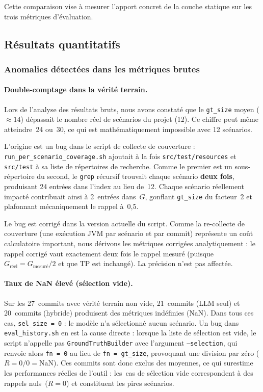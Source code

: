 \documentclass[12pt,a4paper]{article}
\begin{document}
Cette comparaison vise à mesurer l'apport concret de la couche statique
sur les trois métriques d'évaluation.

\subsection{Résultats quantitatifs}

\subsubsection{Anomalies détectées dans les métriques brutes}

\paragraph{Double-comptage dans la vérité terrain.}
Lors de l'analyse des résultats bruts, nous avons constaté que le
\texttt{gt\_size} moyen ($\approx 14$) dépassait le nombre réel de
scénarios du projet (12). Ce chiffre peut même atteindre~24 ou~30, ce
qui est mathématiquement impossible avec 12 scénarios.

L'origine est un bug dans le script de collecte de couverture :
\texttt{run\_per\_scenario\_coverage.sh} ajoutait à la fois
\texttt{src/test/resources} et \texttt{src/test} à sa liste de
répertoires de recherche. Comme le premier est un sous-répertoire du
second, le \texttt{grep} récursif trouvait chaque scénario \textbf{deux fois},
produisant 24 entrées dans l'index au lieu de~12. Chaque scénario
réellement impacté contribuait ainsi à 2~entrées dans~$G$, gonflant
\texttt{gt\_size} du facteur~2 et plafonnant mécaniquement le rappel à~0{,}5.

Le bug est corrigé dans la version actuelle du script. Comme la
re-collecte de couverture (une exécution JVM par scénario et par commit)
représente un coût calculatoire important, nous dérivons les métriques
corrigées analytiquement : le rappel corrigé vaut exactement deux fois
le rappel mesuré (puisque $G_{\text{réel}} = G_{\text{mesuré}} / 2$ et
que TP est inchangé). La précision n'est pas affectée.

\paragraph{Taux de NaN élevé (sélection vide).}
Sur les 27~commits avec vérité terrain non vide, 21~commits (LLM seul)
et 20~commits (hybride) produisent des métriques indéfinies (NaN).
Dans tous ces cas, \texttt{sel\_size = 0} : le modèle n'a sélectionné
aucun scénario. Un bug dans \texttt{eval\_history.sh} en est la cause
directe : lorsque la liste de sélection est vide, le script n'appelle
pas \texttt{GroundTruthBuilder} avec l'argument \texttt{--selection},
qui renvoie alors \texttt{fn = 0} au lieu de \texttt{fn = gt\_size},
provoquant une division par zéro ($R = 0/0 = \text{NaN}$). Ces commits
sont donc exclus des moyennes, ce qui surestime les performances réelles
de l'outil : les~cas de sélection vide correspondent à des rappels
nuls~($R = 0$) et constituent les pires scénarios.
\end{document}
